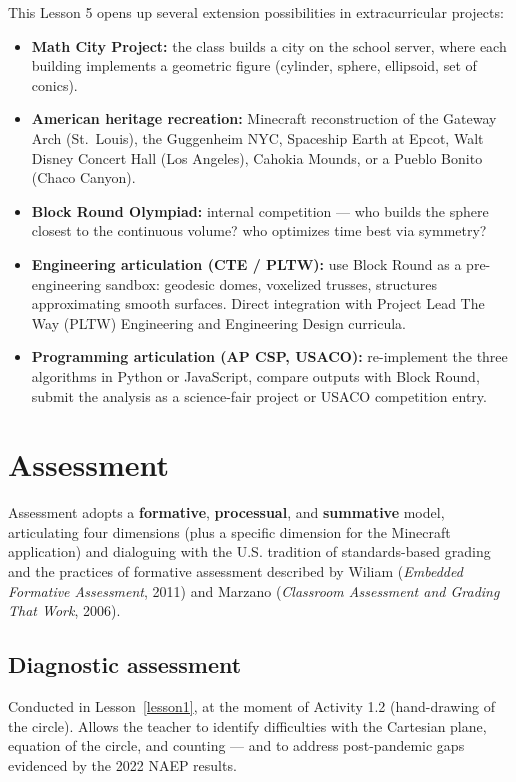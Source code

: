 \documentclass[12pt,a4paper]{scrartcl}
\newcommand{\acc}[1]{\textcolor{accent}{\textbf{#1}}}
\begin{document}
\begin{minecraft}
This Lesson 5 opens up several extension possibilities in extracurricular projects:
\begin{itemize}[leftmargin=1.3em,itemsep=0.15em,topsep=0.3em,nosep]
  \item \textbf{Math City Project:} the class builds a city on the school server, where each building implements a geometric figure (cylinder, sphere, ellipsoid, set of conics).
  \item \textbf{American heritage recreation:} Minecraft reconstruction of the Gateway Arch (St.\ Louis), the Guggenheim NYC, Spaceship Earth at Epcot, Walt Disney Concert Hall (Los Angeles), Cahokia Mounds, or a Pueblo Bonito (Chaco Canyon).
  \item \textbf{Block Round Olympiad:} internal competition --- who builds the sphere closest to the continuous volume? who optimizes time best via symmetry?
  \item \textbf{Engineering articulation (CTE / PLTW):} use Block Round as a pre-engineering sandbox: geodesic domes, voxelized trusses, structures approximating smooth surfaces. Direct integration with Project Lead The Way (PLTW) Engineering and Engineering Design curricula.
  \item \textbf{Programming articulation (AP CSP, USACO):} re-implement the three algorithms in Python or JavaScript, compare outputs with Block Round, submit the analysis as a science-fair project or USACO competition entry.
\end{itemize}
\end{minecraft}

\section{Assessment}\label{sec:assessment}

Assessment adopts a \acc{formative}, \acc{processual}, and \acc{summative} model, articulating four dimensions (plus a specific dimension for the Minecraft application) and dialoguing with the U.S. tradition of standards-based grading and the practices of formative assessment described by Wiliam (\emph{Embedded Formative Assessment}, 2011) and Marzano (\emph{Classroom Assessment and Grading That Work}, 2006).

\subsection{Diagnostic assessment}
Conducted in Lesson~\ref{lesson1}, at the moment of Activity 1.2 (hand-drawing of the circle). Allows the teacher to identify difficulties with the Cartesian plane, equation of the circle, and counting --- and to address post-pandemic gaps evidenced by the 2022 NAEP results.
\end{document}

